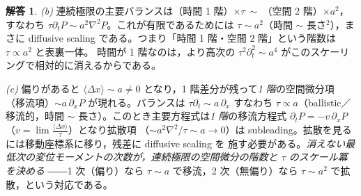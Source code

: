 \documentclass[dvipdfmx, uplatex]{jsarticle}
\theoremstyle{definition}
\newtheorem*{sol}{解答}
\begin{document}
\begin{sol}
\textit{(b)} 連続極限の主要バランスは（時間 1 階）$\times\tau\ \sim\ $（空間 2 階）$\times a^2$，すなわち
$\tau\partial_tP\sim a^2\nabla^2P$。これが有限であるためには $\tau\sim a^2$（時間 $\sim$ 長さ$^2$），まさに
diffusive scaling である。つまり「時間 1 階・空間 2 階」という階数は $\tau\propto a^2$ と表裏一体。
時間が 1 階なのは，より高次の $\tau^2\partial_t^2\sim a^4$ がこのスケーリングで相対的に消えるからである。

\textit{(c)} 偏りがあると $\langle\Delta x\rangle\sim a\neq0$ となり，1 階差分が残って\emph{1 階}の空間微分項
（移流項）$\sim a\,\partial_xP$ が現れる。バランスは $\tau\partial_t\sim a\,\partial_x$ すなわち
$\boxed{\tau\propto a}$（ballistic／移流的，時間 $\sim$ 長さ）。このとき主要方程式は\emph{1 階}の移流方程式
$\boxed{\partial_tP=-v\,\partial_xP}$（$v=\lim\frac{\langle\Delta x\rangle}{\tau}$）となり拡散項
（$\sim a^2\nabla^2/\tau\sim a\to0$）は subleading。拡散を見るには移動座標系に移り，残差に diffusive scaling を
施す必要がある。\emph{消えない最低次の変位モーメントの次数が，連続極限の空間微分の階数と $\tau$ のスケール冪を決める}
――1 次（偏り）なら $\tau\sim a$ で移流，2 次（無偏り）なら $\tau\sim a^2$ で拡散，という対応である。
\end{sol}
\end{document}
